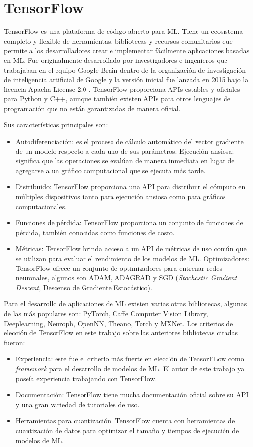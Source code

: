 \section{TensorFlow}
TensorFlow es una plataforma de código abierto para ML. Tiene un ecosistema completo y flexible de herramientas, bibliotecas y recursos comunitarios que permite a los desarrolladores crear e implementar fácilmente aplicaciones basadas en ML. Fue originalmente desarrollado por investigadores e ingenieros que trabajaban en el equipo Google Brain dentro de la organización de investigación de inteligencia artificial de Google y la versión inicial fue lanzada en 2015 bajo la licencia Apacha License 2.0 \cite{tf_info}. TensorFlow proporciona APIs estables y oficiales para Python y C++, aunque también existen APIs para otros lenguajes de programación que no están garantizadas de manera oficial.

Sus características principales son:
\begin{itemize}
	\item Autodiferenciación: es el proceso de cálculo automático del vector gradiente de un modelo respecto a cada uno de sus parámetros.
	Ejecución ansiosa: significa que las operaciones se evalúan de manera inmediata en lugar de agregarse a un gráfico computacional que se ejecuta más tarde.
	\item Distribuido: TensorFlow proporciona una API para distribuir el cómputo en múltiples dispositivos tanto para ejecución ansiosa como para gráficos computacionales.
	\item Funciones de pérdida: TensorFlow proporciona un conjunto de funciones de pérdida, también conocidas como funciones de costo.
	\item Métricas: TensorFlow brinda acceso a un API de métricas de uso común que se utilizan para evaluar el rendimiento de los modelos de ML.
	Optimizadores: TensorFlow ofrece un conjunto de optimizadores para entrenar redes neuronales, algunos son ADAM, ADAGRAD y SGD (\textit{Stochastic Gradient Descent}, Descenso de Gradiente Estocástico).
\end{itemize}

Para el desarrollo de aplicaciones de ML existen varias otras bibliotecas, algunas de las más populares son: PyTorch, Caffe Computer Vision Library, Deeplearning, Neuroph, OpenNN, Theano, Torch y MXNet. Los criterios de elección de TensorFlow en este trabajo sobre las anteriores bibliotecas citadas fueron:
\begin{itemize}
	\item Experiencia: este fue el criterio más fuerte en elección de TensorFLow como \textit{framework} para el desarrollo de modelos de ML. El autor de este trabajo ya poseía experiencia trabajando con TensorFlow.
	\item Documentación: TensorFlow tiene mucha documentación oficial sobre su API y una gran variedad de tutoriales de uso.
	\item Herramientas para cuantización: TensorFlow cuenta con herramientas de cuantización de datos para optimizar el tamaño y tiempos de ejecución de modelos de ML.
\end{itemize}

